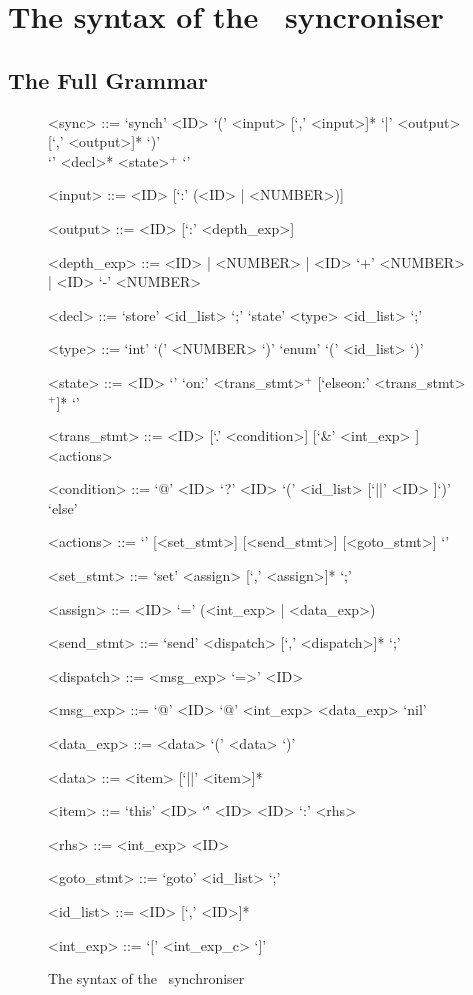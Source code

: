 \chapter{The syntax of the \ak\ syncroniser}

  \section{The Full Grammar\label{sync_syntax}}
\setlength{\grammarindent}{8em} %
\begin{figure}%
\scriptsize
\begin{grammar}
<sync> ::= `synch' <ID> `(' <input> [`,' <input>]* `|' <output> [`,' <output>]* `)' \\
           `{' <decl>* <state>$^+$ `}'

<input>  ::= <ID> [`:' (<ID> | <NUMBER>)]

<output>  ::= <ID> [`:' <depth\_exp>]

<depth\_exp> ::= <ID> | <NUMBER> | <ID> `+' <NUMBER> | <ID> `-' <NUMBER>

<decl> ::= `store' <id\_list> `;'
        \alt `state' <type> <id\_list> `;'

<type> ::= `int' `(' <NUMBER> `)'
                  \alt `enum' `(' <id\_list> `)'

<state> ::= <ID> `{' `on:' <trans\_stmt>$^+$ [`elseon:' <trans\_stmt>$^+$]* `}'

<trans\_stmt> ::= <ID> [`.' <condition>] [`&' <int\_exp> ] <actions>

<condition> ::= `@' <ID>
             \alt `?' <ID>
             \alt [`?' <ID>] `(' <id\_list> [`||' <ID> ]`)'
             \alt `else'

<actions> ::= `{' [<set\_stmt>] [<send\_stmt>] [<goto\_stmt>] `}'

<set\_stmt> ::= `set' <assign> [`,' <assign>]* `;'

<assign> ::= <ID> `=' (<int\_exp> | <data\_exp>)

<send\_stmt> ::= `send' <dispatch> [`,' <dispatch>]*  `;'

<dispatch> ::= <msg\_exp> `=>' <ID>

<msg\_exp> ::= `@' <ID>
           \alt `@' <int\_exp>
           \alt [`?' <ID>] <data\_exp>
           \alt `nil'

<data\_exp> ::= <data>
             \alt `(' <data> `)'

<data> ::= <item> [`||' <item>]*

<item> ::= `this'
        \alt <ID>
        \alt `\'' <ID>
        \alt <ID> `:' <rhs>

<rhs> ::= <int\_exp>
          \alt <ID>

<goto\_stmt> ::= `goto' <id\_list> `;'

<id\_list> ::= <ID> [`,' <ID>]*

<int\_exp> ::= `[' <int\_exp\_c> `]'
\end{grammar}
\caption{The syntax of the \ak\ synchroniser}
\end{figure}


